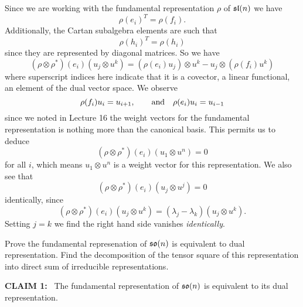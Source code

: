 Since we are working with the fundamental representation $\rho$
of $\frak{sl}(n)$ we have
\begin{equation}
\rho({e_{i}})^{T}=\rho(f_{i}).
\end{equation}
Additionally, the Cartan subalgebra elements are such that
\begin{equation}
\rho(h_{i})^{T}=\rho(h_{i})
\end{equation}
since they are represented by diagonal matrices. So we have
\begin{equation}
(\rho\otimes\rho^{*})(e_{i})(u_{j}\otimes
  u^{k})=(\rho(e_{i})u_{j})\otimes u^{k}-u_{j}\otimes(\rho(f_{i})u^{k})
\end{equation}
where superscript indices here indicate that it is a covector, a
linear functional, an element of the dual vector space. We observe
\begin{equation}
\rho(f_{i})u_{i}=u_{i+1},\qquad\hbox{and}\quad\rho(e_{i})u_{i}=u_{i-1}
\end{equation}
since we noted in Lecture 16 the weight vectors for the
fundamental representation is nothing more than the canonical
basis. This permits us to deduce
\begin{equation}
(\rho\otimes\rho^{*})(e_{i})(u_{1}\otimes u^{n})=0
\end{equation}
for all $i$, which means $u_{1}\otimes u^{n}$ is a weight vector
for this representation. We also see that
\begin{equation}
(\rho\otimes\rho^{*})(e_{i})(u_{j}\otimes u^{j})=0
\end{equation}
identically, since
\begin{equation}
(\rho\otimes\rho^{*})(e_{i})(u_{j}\otimes u^{k})=(\lambda_{j}-\lambda_{k})(u_{j}\otimes u^{k}).
\end{equation}
Setting $j=k$ we find the right hand side vanishes \emph{identically}.

\begin{exercise}
Prove the fundamental represenation of $\frak{so}(n)$ is
equivalent to dual representation. Find the decomposition of the
tensor square of this representation into direct sum of
irreducible representations.
\end{exercise}

\noindent\textbf{C\uppercase{{\footnotesize laim}} 1:}~
The fundamental representation of $\frak{so}(n)$ is equivalent to
its dual representation.

